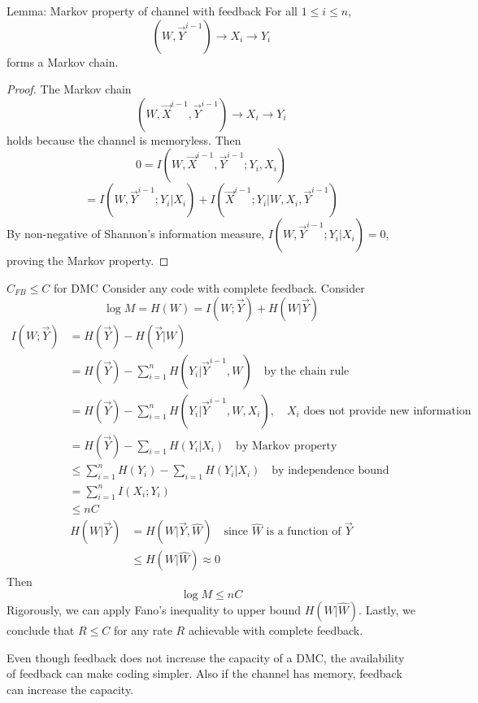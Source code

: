 \documentclass[../main.tex]{subfiles}
\begin{document}
 \begin{bbox}{Lemma: Markov property of channel with feedback}
 For all $1\leq i\leq n$, \[
 (W,\vec Y^{i-1})\to X_i\to Y_i
 \] forms a Markov chain.
 \begin{proof}
     The Markov chain \[
     (W,\vec X^{i-1}, \vec Y^{i-1})\to X_i\to Y_i
     \] holds because the channel is memoryless. 
     \newline
     Then \[
     0 = I(W,\vec X^{i-1}, \vec Y^{i-1};Y_i,X_i)
     \]
     \[
     = I(W,\vec Y^{i-1};Y_i|X_i) + I(\vec X^{i-1}; Y_i|W,X_i,\vec Y^{i-1})
     \]
     By non-negative of Shannon's information measure, $I(W,\vec Y^{i-1};Y_i|X_i) = 0$, proving the Markov property.
 \end{proof}
 \end{bbox}
 
 \begin{bbox}{$C_{FB}\leq C$ for DMC}
    Consider any code with complete feedback.
    \newline
    Consider \[
    \log M = H(W) = I(W;\vec Y) + H(W|\vec Y)
    \]
    \begin{align*}
        I(W;\vec Y) &= H(\vec Y) - H(\vec Y|W)\\
        &= H(\vec Y) - \sum_{i=1}^n H(Y_i|\vec Y^{i-1}, W) \quad \text{by the chain rule}\\
        &= H(\vec Y) - \sum_{i=1}^n H(Y_i|\vec Y^{i-1},W,X_i), \quad \text{$X_i$ does not provide new information}\\
        &= H(\vec Y)-\sum_{i=1}H(Y_i|X_i) \quad \text{by Markov property}\\
        &\leq \sum_{i=1}^nH(Y_i)- \sum_{i=1}H(Y_i|X_i) \quad \text{by independence bound}\\
        &= \sum_{i=1}^n I(X_i;Y_i)\\
        &\leq nC
    \end{align*}
    \begin{align*}
        H(W|\vec Y)&=H(W|\vec Y, \hat{W}) \quad \text{since $\hat{W}$ is a function of $\vec Y$}\\
        &\leq H(W|\hat{W})\approx 0
    \end{align*}
    Then \[
    \log M \leq nC
    \]
    Rigorously, we can apply Fano's inequality to upper bound $H(W|\hat{W})$.
    \newline
    Lastly, we conclude that $R\leq C$ for any rate $R$ achievable with complete feedback.
 \end{bbox}
 Even though feedback does not increase the capacity of a DMC, the availability of feedback can make coding simpler.
 \newline
 Also if the channel has memory, feedback can increase the capacity.
\end{document}

